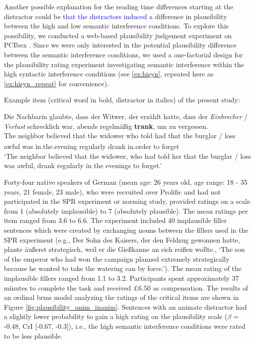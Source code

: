 \documentclass[review,preprint,12pt,authoryear,floatsintext]{elsarticle}
\begin{document}
Another possible explanation for the reading time differences starting at the distractor could be \textcolor{blue}{that the distractors induced} a difference in plausibility between the high and low semantic interference conditions. To explore this possibility, we conducted a web-based plausibility judgement experiment on PCIbex  \citep{pcibex}. Since we were only interested in the potential plausibility difference between the semantic interference conditions, we used a one-factorial design for the plausibility rating experiment investigating semantic interference within the high syntactic interference conditions (see \ref{ex:hisyn}, repeated here as \ref{ex:hisyn_repeat} for convenience).

\begin{exe}  
\ex \label{ex:materials_repeat} Example item (critical word in bold, distractor in italics) of the present study:
    \begin{xlist}   
    \label{ex:hisyn_repeat} 
    \gll Die  Nachbarin glaubte,	dass	der Witwer,  der  erzählt hatte, dass der \textit{Einbrecher} / \textit{Verlust}  schrecklich war, abends regelmäßig \textbf{trank}, um zu vergessen.\\ 
    The\textsubscript{} neighbor\textsubscript{} believed that the widower who told had that the burglar / loss awful was in.the.evening regularly drank in.order to forget \\
    \trans `The neighbor believed that the widower, who had told her that the burglar / loss was awful, drank regularly in the evenings to forget.' \\
    \end{xlist}
\end{exe}

Forty-four native speakers of German (mean age: 26 years old, age range: 18 - 35 years, 21 female, 23 male), who were recruited over Prolific and had not participated in the SPR experiment or norming study, provided ratings on a scale from 1 (absolutely implausible) to 7 (absolutely plausible). The mean ratings per item ranged from 3.6 to 6.6. The experiment included 40 implausible filler sentences which were created by exchanging nouns between the fillers used in the SPR experiment (e.g., Der Sohn des Kaisers, der den Feldzug gewonnen hatte, plante äußerst strategisch, weil er die Gießkanne an sich reißen wollte., `The son of the emperor who had won the campaign planned extremely strategically because he wanted to take the watering can by force.').  The mean rating of the implausible fillers ranged from 1.1 to 3.2. Participants spent approximately 37 minutes to complete the task and received \pounds 6.50 as compensation. The results of an ordinal brms model analyzing the ratings of the critical items are shown in Figure \ref{fig:plausibility_anim_inanim}. Sentences with an animate distractor had a slightly lower probability to gain a high rating on the plausibility scale ($\beta$ = -0.48, CrI [-0.67, -0.3]), i.e., the high semantic interference conditions were rated to be less plausible.
\end{document}

